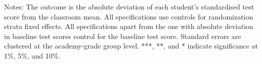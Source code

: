 \begin{center}
\begin{scriptsize}
\begin{threeparttable}
\begin{tabular} {@{} l l c c c c c c c c c c c c c c  @{}}
\midrule
\bottomrule
\end{tabular}
\begin{tablenotes}
\item Notes: The outcome is the absolute deviation of each student's standardised test score from the classroom mean. All specifications use controls for randomization strata fixed effects. All specifications apart from the one with absolute deviation in baseline test scores control for the baseline test score. Standard errors are clustered at the academy-grade group level. ***, **, and * indicate significance at 1\%, 5\%, and 10\%.   \end{tablenotes}
\end{threeparttable}
\end{scriptsize}
\end{center}
\clearpage
